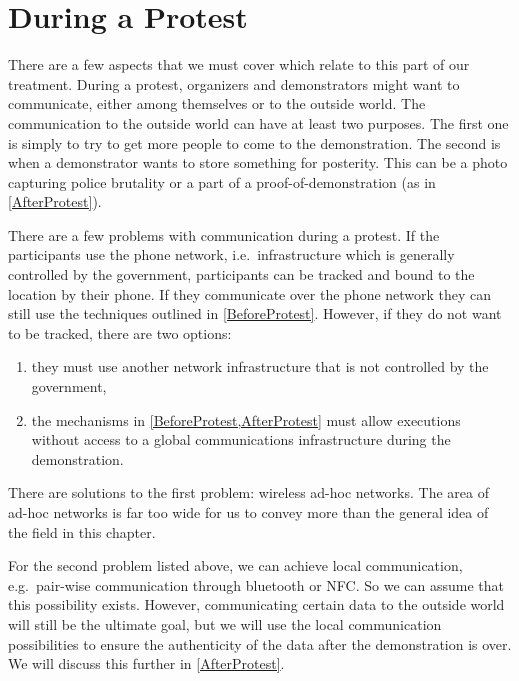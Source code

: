 \section{During a Protest}
\label{DuringProtest}

There are a few aspects that we must cover which relate to this part of our 
treatment.
During a protest, organizers and demonstrators might want to communicate, 
either among themselves or to the outside world.
The communication to the outside world can have at least two purposes.
The first one is simply to try to get more people to come to the demonstration.
The second is when a demonstrator wants to store something for posterity.
This can be a photo capturing police brutality or a part of 
a proof-of-demonstration (as in \cref{AfterProtest}).

There are a few problems with communication during a protest.
If the participants use the phone network, i.e.\ infrastructure which is 
generally controlled by the government, participants can be tracked and bound 
to the location by their phone.
If they communicate over the phone network they can still use the techniques 
outlined in \cref{BeforeProtest}.
However, if they do not want to be tracked, there are two options:
\begin{enumerate}
  \item they must use another network infrastructure that is not controlled by 
    the government,
  \item the mechanisms in \cref{BeforeProtest,AfterProtest} must allow 
    executions without access to a global communications infrastructure during 
    the demonstration.
\end{enumerate}

There are solutions to the first problem: wireless ad-hoc networks.
The area of ad-hoc networks is far too wide for us to convey more than the 
general idea of the field in this chapter. %


For the second problem listed above, we can achieve local communication, e.g.\ 
pair-wise communication through bluetooth or \ac{NFC}.
So we can assume that this possibility exists.
However, communicating certain data to the outside world will still be the 
ultimate goal, but we will use the local communication possibilities to ensure 
the authenticity of the data after the demonstration is over.
We will discuss this further in \cref{AfterProtest}.

